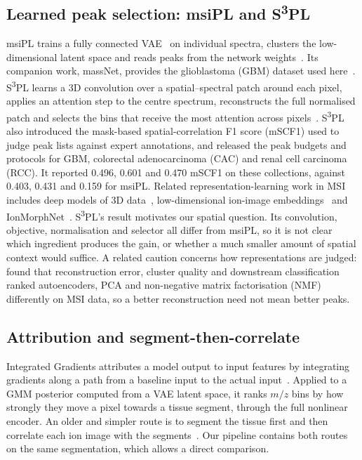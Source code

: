 \subsection{Learned peak selection: msiPL and S\textsuperscript{3}PL}
msiPL trains a fully connected VAE~\citep{kingma2014autoencoding} on
individual spectra, clusters the low-dimensional latent space and reads peaks
from the network weights~\citep{abdelmoula2021peak}. Its companion work,
massNet, provides the glioblastoma (GBM) dataset used
here~\citep{abdelmoula2022massnet}. S\textsuperscript{3}PL learns a 3D convolution over a
spatial--spectral patch around each pixel, applies an attention step to the centre
spectrum, reconstructs the full normalised patch and selects the bins that
receive the most attention across pixels~\citep{weigand2026spatial}. S\textsuperscript{3}PL also
introduced the mask-based spatial-correlation F1 score (mSCF1) used to judge
peak lists against expert annotations, and released the peak budgets and
protocols for GBM, colorectal adenocarcinoma (CAC) and renal cell carcinoma
(RCC). It reported 0.496, 0.601 and 0.470 mSCF1 on these collections, against
0.403, 0.431 and 0.159 for msiPL. Related representation-learning work in MSI
includes deep models of 3D data~\citep{inglese2017deep}, low-dimensional
ion-image embeddings~\citep{guo2024deepion} and IonMorphNet~\citep{weigand2026ionmorphnet}.
S\textsuperscript{3}PL's result motivates our spatial question. Its convolution, objective,
normalisation and selector all differ from msiPL, so it is not clear which
ingredient produces the gain, or whether a much smaller amount of spatial
context would suffice. A related caution concerns how representations are judged:
\citet{mazarura2025autoencoder} found that reconstruction error, cluster
quality and downstream classification ranked autoencoders, PCA and non-negative matrix factorisation (NMF)
differently on MSI data, so a better reconstruction need not mean better peaks.

\subsection{Attribution and segment-then-correlate}
Integrated Gradients attributes a model output to input features by
integrating gradients along a path from a baseline input to the actual
input~\citep{sundararajan2017axiomatic}. Applied to a GMM posterior computed
from a VAE latent space, it ranks $m/z$ bins by how strongly they move a pixel
towards a tissue segment, through the full nonlinear encoder. An older and
simpler route is to segment the tissue first and then correlate each ion image
with the segments~\citep{alexandrov2010spatial,alexandrov2011efficient}. Our
pipeline contains both routes on the same segmentation, which allows a direct
comparison.

